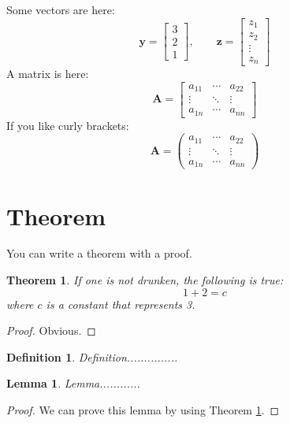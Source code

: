\documentclass[letterpaper, 11pt]{article}
\newtheorem{theorem}{Theorem}
\newtheorem{lemma}{Lemma}
\newtheorem{definition}{Definition}
\renewcommand{\vec}[1]{\bm{#1}}
\newcommand{\mat}[1]{\bm{#1}}
\begin{document}
Some vectors are here:
\[
	\vec{y} = \begin{bmatrix} 3 \\ 2 \\ 1 \end{bmatrix}, \qquad
	\vec{z} = \begin{bmatrix} z_1 \\ z_2 \\ \vdots \\ z_n \end{bmatrix}
\]
A matrix is here:
\[
	\mat{A} = \begin{bmatrix} a_{11} & \cdots & a_{22}  \\
							  \vdots & \ddots & \vdots  \\
							  a_{1n} & \cdots & a_{nn}  \end{bmatrix}
\]
If you like curly brackets:
\[
	\mat{A} = \begin{pmatrix} a_{11} & \cdots & a_{22}  \\
							  \vdots & \ddots & \vdots  \\
							  a_{1n} & \cdots & a_{nn}  \end{pmatrix}
\]



\section{Theorem}

You can write a theorem with a proof.

\begin{theorem} \label{thm:fundamental}
If one is not drunken, the following is true:
\begin{equation}
	1 + 2 = c
\end{equation}
where $c$ is a constant that represents 3.
\end{theorem}
\begin{proof}
Obvious.
\end{proof}

\begin{definition}
Definition...............
\end{definition}

\begin{lemma}
Lemma............
\end{lemma}
\begin{proof}
We can prove this lemma by using Theorem \ref{thm:fundamental}.
\end{proof}
\end{document}
